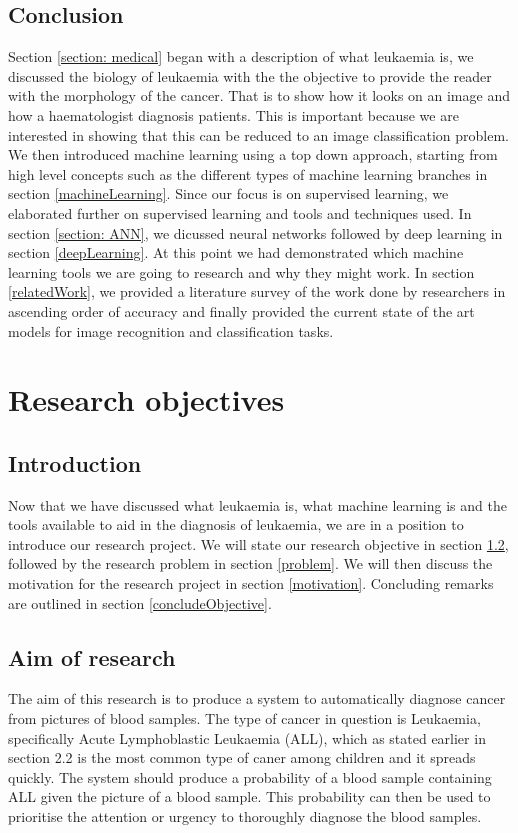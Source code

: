 \documentclass[a4paper,11pt]{article}
\begin{document}
\subsection{Conclusion}
Section \ref{section: medical} began with a description of what leukaemia is, we discussed the biology of leukaemia with the the  objective to provide the reader with the morphology of the cancer. That is to show how it looks on an image and how a haematologist diagnosis patients. This is important because we are interested in showing that this can be reduced to an image classification problem. We then introduced machine learning using a top down approach, starting from high level concepts such as the different types of machine learning branches in section \ref{machineLearning}. Since our focus is on supervised learning, we elaborated further on supervised learning and tools and techniques used. In section \ref{section: ANN}, we dicussed neural networks  followed by deep learning in section \ref{deepLearning}.  At this point we had demonstrated which machine learning tools we are going to research and why they might work. In section \ref{relatedWork}, we provided a literature survey of the work done by researchers in ascending order of accuracy and finally provided the current state of the art models for image recognition and classification tasks.
\section{Research objectives}
\label{objective}
\subsection{Introduction}
Now that we have discussed what leukaemia is, what machine learning is and the tools available to aid in the diagnosis of leukaemia, we are in a position to introduce our research project. We will state our research objective in section \ref{aim}, followed by the research problem in section \ref{problem}. We will then discuss the motivation for the research project in section \ref{motivation}. Concluding remarks are outlined in section \ref{concludeObjective}.
\subsection{Aim of research}
\label{aim}
The aim of this research is to produce a system to automatically diagnose cancer from pictures of blood samples. The type of cancer in question is Leukaemia, specifically Acute Lymphoblastic Leukaemia (ALL), which as stated earlier in section 2.2 is the most common type of caner among children and it spreads quickly. The system should produce a probability of a blood sample containing ALL given the picture of a blood sample. This probability can then be used to prioritise the attention or urgency to thoroughly diagnose the blood samples. 
\end{document}
